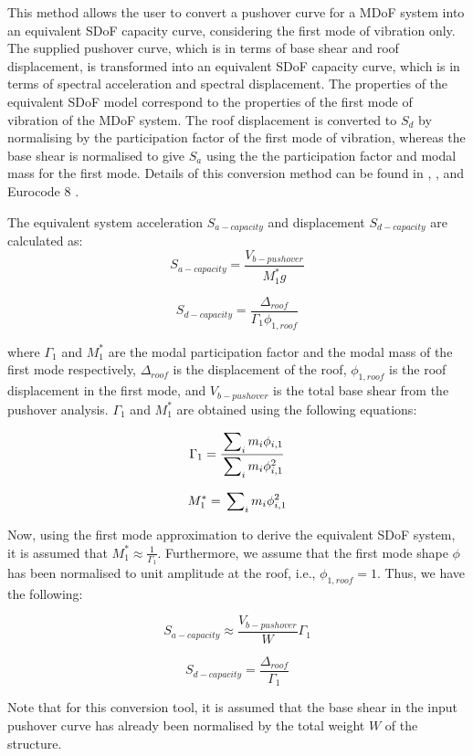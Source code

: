 This method allows the user to convert a pushover curve for a MDoF system into an equivalent SDoF capacity curve, considering the first mode of vibration only. The supplied pushover curve, which is in terms of base shear and roof displacement, is transformed into an equivalent SDoF capacity curve, which is in terms of spectral acceleration and spectral displacement. The properties of the equivalent SDoF model correspond to the properties of the first mode of vibration of the MDoF system. The roof displacement is converted to $S_d$ by normalising by the participation factor of the first mode of vibration, whereas the base shear is normalised to give $S_a$ using the the participation factor and modal mass for the first mode. Details of this conversion method can be found in \citet{ATC1996}, \citet{FEMA4402005}, and Eurocode 8 \citep{CEN2005}.

The equivalent system acceleration $S_{a-capacity}$ and displacement $S_{d-capacity}$ are calculated as:
\begin{equation}
	S_{a-capacity} = \frac{V_{b-pushover}}{M_{1}^{*} g}
\end{equation}

\begin{equation}
	S_{d-capacity} = \frac{\Delta_{roof}}{\Gamma_{1} \phi_{1, roof}}
\end{equation}

where $\Gamma_{1}$ and $M_{1}^{*}$ are the modal participation factor and the modal mass of the first mode respectively, $\Delta_{roof}$ is the displacement of the roof, $\phi_{1, roof}$ is the roof displacement in the first mode, and $V_{b-pushover}$ is the total base shear from the pushover analysis. $\Gamma_{1}$ and $M_{1}^{*}$ are obtained using the following equations:

\begin{equation}
	\Gamma_{1} = \frac{\sideset{}{_i}\sum m_i \phi_{i,1}}{\sideset{}{_i}\sum m_i \phi_{i,1}^2}
\end{equation}

\begin{equation}
	M_{1}^{*} = \sideset{}{_i}\sum m_i \phi_{i,1}^2
\end{equation}

Now, using the first mode approximation to derive the equivalent SDoF system, it is assumed that $M_{1}^{*} \approx \frac{1}{\Gamma_{1}}$. Furthermore, we assume that the first mode shape $\phi$ has been normalised to unit amplitude at the roof, i.e., $\phi_{1, roof} = 1$. Thus, we have the following:

\begin{equation}
	S_{a-capacity} \approx \frac{V_{b-pushover}}{W} \Gamma_1
\end{equation}

\begin{equation}
	S_{d-capacity} = \frac{\Delta_{roof}}{\Gamma_1}
\end{equation}

Note that for this conversion tool, it is assumed that the base shear in the input pushover curve has already been normalised by the total weight $W$ of the structure.